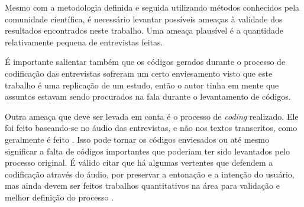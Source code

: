 Mesmo com a metodologia definida e seguida utilizando métodos conhecidos pela comunidade científica, é necessário levantar possíveis ameaças à validade dos resultados encontrados neste trabalho. Uma ameaça plausível é a quantidade relativamente pequena de entrevistas feitas.

É importante salientar também que os códigos gerados durante o processo de codificação das entrevistas sofreram um certo enviesamento visto que este trabalho é uma replicação de um estudo, então o autor tinha em mente que assuntos estavam sendo procurados na fala durante o levantamento de códigos. 

Outra ameaça que deve ser levada em conta é o processo de \emph{coding} realizado. Ele foi feito baseando-se no áudio das entrevistas, e não nos textos transcritos, como geralmente é feito \cite{groundedTheory}. Isso pode tornar os códigos enviesados ou até mesmo significar a falta de códigos importantes que poderiam ter sido levantados pelo processo original. É válido citar que há algumas vertentes que defendem a codificação através do áudio, por preservar a entonação e a intenção do usuário, mas ainda devem ser feitos trabalhos quantitativos na área para validação e melhor definição do processo \cite{listenCode}. 
